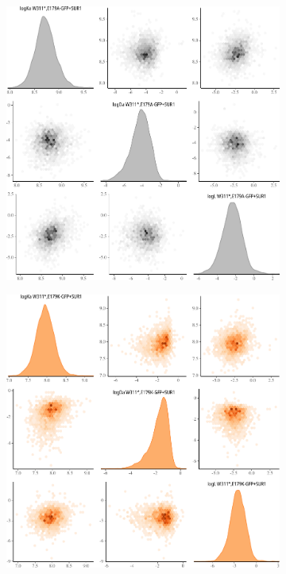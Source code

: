 \begin{figure}[h]
\begin{subfigure}[t]{0.3\textwidth}
	\end{subfigure}
	\hfill
	\begin{subfigure}[t]{0.3\textwidth}
		\caption{}\label{apxfig:inhib_cc_3}
		\centering
		\includegraphics[width=\textwidth]{inhibition_crosscorr_3.pdf}
	\end{subfigure}
	\vfill
	\begin{subfigure}[t]{0.3\textwidth}
		\caption{}\label{apxfig:inhib_cc_4}
		\centering
		\includegraphics[width=\textwidth]{inhibition_crosscorr_4.pdf}

\end{subfigure}
\end{figure}
